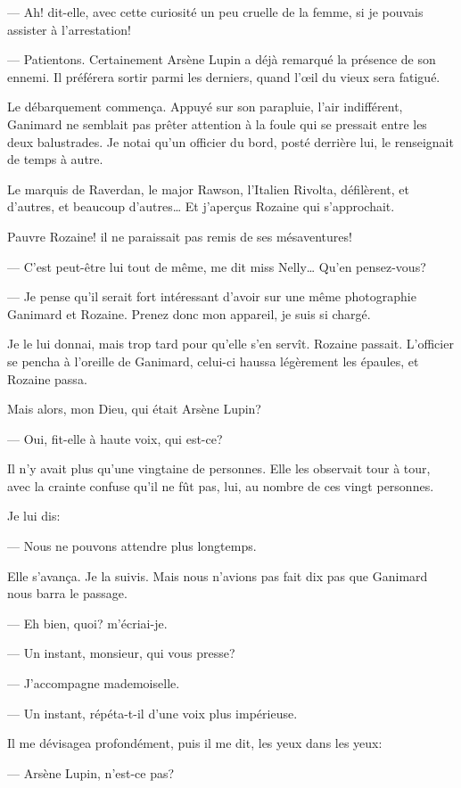 \documentclass[12pt,a4paper]{book}
\begin{document}
— Ah! dit-elle, avec cette curiosité un peu cruelle de la femme, si je pouvais assister à l’arrestation! 

— Patientons. Certainement Arsène Lupin a déjà remarqué la présence de son ennemi. Il préférera sortir parmi les derniers, quand l’œil du vieux sera fatigué.

Le débarquement commença. Appuyé sur son parapluie, l’air indifférent, Ganimard ne semblait pas prêter attention à la foule qui se pressait entre les deux balustrades. Je notai qu’un officier du bord, posté derrière lui, le renseignait de temps à autre.

Le marquis de Raverdan, le major Rawson, l’Italien Rivolta, défilèrent, et d’autres, et beaucoup d’autres… Et j’aperçus Rozaine qui s’approchait.

Pauvre Rozaine! il ne paraissait pas remis de ses mésaventures!

— C’est peut-être lui tout de même, me dit miss Nelly… Qu’en pensez-vous?

— Je pense qu’il serait fort intéressant d’avoir sur une même photographie Ganimard et Rozaine. Prenez donc mon appareil, je suis si chargé.

Je le lui donnai, mais trop tard pour qu’elle s’en servît. Rozaine passait. L’officier se pencha à l’oreille de Ganimard, celui-ci haussa légèrement les épaules, et Rozaine passa.

Mais alors, mon Dieu, qui était Arsène Lupin?

— Oui, fit-elle à haute voix, qui est-ce? 

Il n’y avait plus qu’une vingtaine de personnes. Elle les observait tour à tour, avec la crainte confuse qu’il ne fût pas, lui, au nombre de ces vingt personnes.

Je lui dis:

— Nous ne pouvons attendre plus longtemps.

Elle s’avança. Je la suivis. Mais nous n’avions pas fait dix pas que Ganimard nous barra le passage.

— Eh bien, quoi? m’écriai-je.

— Un instant, monsieur, qui vous presse?

— J’accompagne mademoiselle.

— Un instant, répéta-t-il d’une voix plus impérieuse.

Il me dévisagea profondément, puis il me dit, les yeux dans les yeux:

— Arsène Lupin, n’est-ce pas?
\end{document}
